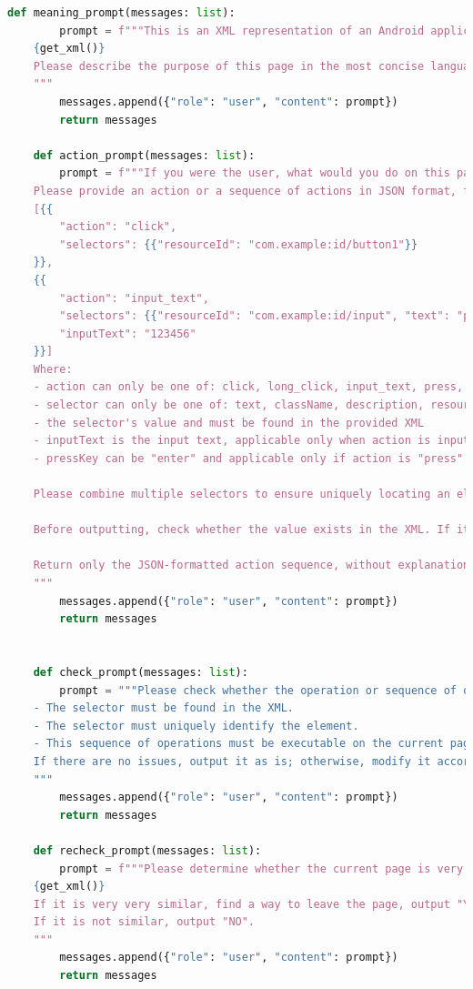 \documentclass[UTF8, fontset=windows]{article}
\begin{document}
\begin{lstlisting}[language=Python]
    def meaning_prompt(messages: list):
        prompt = f"""This is an XML representation of an Android application page:
    {get_xml()}
    Please describe the purpose of this page in the most concise language possible.
    """
        messages.append({"role": "user", "content": prompt})
        return messages
    
    def action_prompt(messages: list):
        prompt = f"""If you were the user, what would you do on this page?
    Please provide an action or a sequence of actions in JSON format, for example:
    [{{
        "action": "click",
        "selectors": {{"resourceId": "com.example:id/button1"}}
    }},
    {{
        "action": "input_text",
        "selectors": {{"resourceId": "com.example:id/input", "text": "password"}}
        "inputText": "123456"
    }}]
    Where:
    - action can only be one of: click, long_click, input_text, press, swipe, scroll
    - selector can only be one of: text, className, description, resourceId (must be in camelCase); choose the selector that uniquely identifies the element
    - the selector's value and must be found in the provided XML
    - inputText is the input text, applicable only when action is input_text
    - pressKey can be "enter" and applicable only if action is "press"
    
    Please combine multiple selectors to ensure uniquely locating an element.
    
    Before outputting, check whether the value exists in the XML. If it does not exist, modify the action accordingly.
    
    Return only the JSON-formatted action sequence, without explanations or code blocks.
    """
        messages.append({"role": "user", "content": prompt})
        return messages
    
    
    def check_prompt(messages: list):
        prompt = """Please check whether the operation or sequence of operations you just generated meets the requirements:
    - The selector must be found in the XML.
    - The selector must uniquely identify the element.
    - This sequence of operations must be executable on the current page.
    If there are no issues, output it as is; otherwise, modify it accordingly.
    """
        messages.append({"role": "user", "content": prompt})
        return messages
    
    def recheck_prompt(messages: list):
        prompt = f"""Please determine whether the current page is very very similar to the previously displayed XML page.
    {get_xml()}
    If it is very very similar, find a way to leave the page, output "YES", and then output the operation sequence according to the previous rules.
    If it is not similar, output "NO".
    """
        messages.append({"role": "user", "content": prompt})
        return messages
    


\end{lstlisting}
\end{document}
